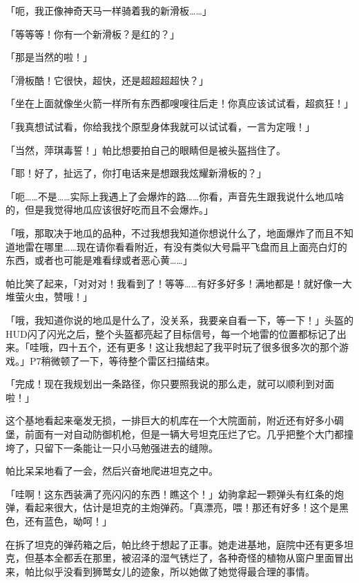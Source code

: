 「呃，我正像神奇天马一样骑着我的新滑板……」

「等等等！你有一个新滑板？是红的？」

「那是当然的啦！」

「滑板酷！它很快，超快，还是超超超超快？」

「坐在上面就像坐火箭一样所有东西都嗖嗖往后走！你真应该试试看，超疯狂！」

「我真想试试看，你给我找个原型身体我就可以试试看，一言为定哦！」

「当然，萍琪毒誓！」帕比想要拍自己的眼睛但是被头盔挡住了。

「耶！好了，扯远了，你打电话来是想跟我炫耀新滑板的？」

「呃……不是……实际上我遇上了会爆炸的路……你看，声音先生跟我说什么地瓜啥的，但是我觉得地瓜应该很好吃而且不会爆炸。」

「哦，那取决于地瓜的品种，不过我想我知道你想说什么了，地面爆炸了而且不知道地雷在哪里……现在请你看看附近，有没有类似大号扁平飞盘而且上面亮白灯的东西，或者也可能是难看绿或者恶心黄……」

帕比笑了起来，「对对对！我看到了！等等……有好多好多！满地都是！就好像一大堆萤火虫，赞哦！」

「哦，我知道你说的地瓜是什么了，没关系，我要亲自看一下，等一下！」头盔的HUD闪了闪光之后，整个头盔都亮起了目标信号，每一个地雷的位置都标记了出来。「哇哦，四十五个，还有更多！这让我想起了我平时玩了很多很多次的那个游戏。」P7稍微顿了一下，等待整个雷区扫描结束。

「完成！现在我规划出一条路径，你只要照我说的那么走，就可以顺利到对面啦！」

\horizonline


这个基地看起来毫发无损，一排巨大的机库在一个大院面前，附近还有好多小碉堡，前面有一对自动防御机枪，但是一辆大号坦克压烂了它。几乎把整个大门都撞垮了，只留下一条能让一只小马勉强进去的缝隙。

帕比呆呆地看了一会，然后兴奋地爬进坦克之中。

「哇啊！这东西装满了亮闪闪的东西！瞧这个！」幼驹拿起一颗弹头有红条的炮弹，看起来很大，估计是坦克的主炮弹药。「真漂亮，喂！那还有好多！这个是黑色，还有蓝色，呦呵！」

在拆了坦克的弹药箱之后，帕比终于想起了正事。她走进基地，庭院中还有更多坦克，但基本全都丢在那里，被沼泽的湿气锈烂了，各种奇怪的植物从窗户里面冒出来，帕比似乎没看到狮鹫女儿的迹象，所以她做了她觉得最合理的事情。

